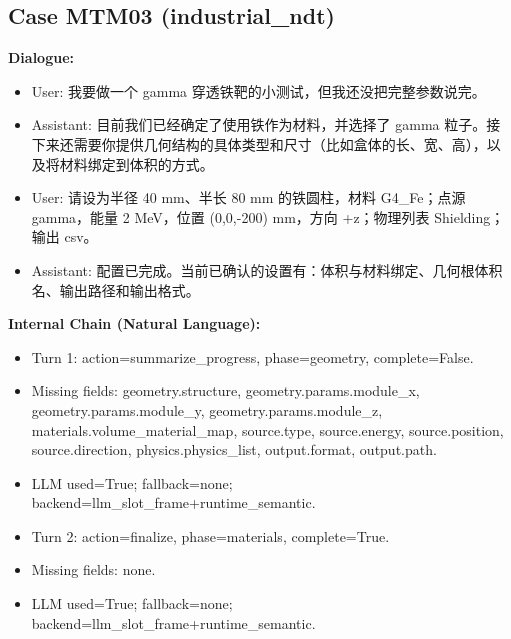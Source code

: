 \documentclass[11pt]{ctexart}
\begin{document}
\subsection{Case MTM03 (industrial\_ndt)}
\textbf{Dialogue:}
\begin{itemize}
\item User: 我要做一个 gamma 穿透铁靶的小测试，但我还没把完整参数说完。
\item Assistant: 目前我们已经确定了使用铁作为材料，并选择了 gamma 粒子。接下来还需要你提供几何结构的具体类型和尺寸（比如盒体的长、宽、高），以及将材料绑定到体积的方式。
\item User: 请设为半径 40 mm、半长 80 mm 的铁圆柱，材料 G4\_Fe；点源 gamma，能量 2 MeV，位置 (0,0,-200) mm，方向 +z；物理列表 Shielding；输出 csv。
\item Assistant: 配置已完成。当前已确认的设置有：体积与材料绑定、几何根体积名、输出路径和输出格式。
\end{itemize}
\textbf{Internal Chain (Natural Language):}
\begin{itemize}
\item Turn 1: action=summarize\_progress, phase=geometry, complete=False.
\item Missing fields: geometry.structure, geometry.params.module\_x, geometry.params.module\_y, geometry.params.module\_z, materials.volume\_material\_map, source.type, source.energy, source.position, source.direction, physics.physics\_list, output.format, output.path.
\item LLM used=True; fallback=none; backend=llm\_slot\_frame+runtime\_semantic.
\item Turn 2: action=finalize, phase=materials, complete=True.
\item Missing fields: none.
\item LLM used=True; fallback=none; backend=llm\_slot\_frame+runtime\_semantic.
\end{itemize}
\end{document}
